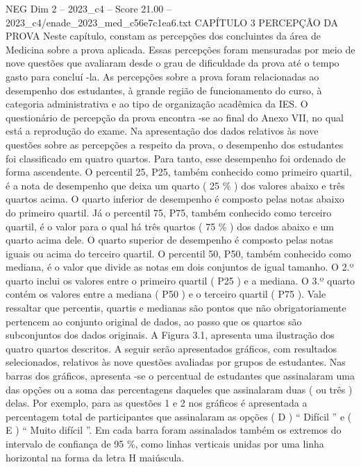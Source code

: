 \begin{textsample}{NEG Dim 2 – 2023\_c4 – Score 21.00 – 2023\_c4/enade\_2023\_med\_c56e7c1ea6.txt}  \label{ex:f2_neg_418}
CAPÍTULO 3 PERCEPÇÃO DA PROVA Neste capítulo, constam as percepções dos concluintes da área de Medicina sobre a prova aplicada.
Essas percepções foram mensuradas por meio de nove questões que avaliaram desde o grau de dificuldade da prova até o tempo gasto para concluí -la.
As percepções sobre a prova foram relacionadas ao desempenho dos estudantes, à grande região de funcionamento do curso, à categoria administrativa e ao tipo de organização acadêmica da IES.
O questionário de percepção da prova encontra -se ao final do Anexo VII, no qual está a reprodução do exame.
Na apresentação dos dados relativos às nove questões sobre as percepções a respeito da prova, o desempenho dos estudantes foi classificado em quatro quartos.
Para tanto, esse desempenho foi ordenado de forma ascendente.
O percentil 25, P25, também conhecido como primeiro quartil, é a nota de desempenho que deixa um quarto ( 25 \% ) dos valores abaixo e três quartos acima.
O quarto inferior de desempenho é composto pelas notas abaixo do primeiro quartil.
Já o percentil 75, P75, também conhecido como terceiro quartil, é o valor para o qual há três quartos ( 75 \% ) dos dados abaixo e um quarto acima dele.
O quarto superior de desempenho é composto pelas notas iguais ou acima do terceiro quartil.
O percentil 50, P50, também conhecido como mediana, é o valor que divide as notas em dois conjuntos de igual tamanho.
O 2.º quarto inclui os valores entre o primeiro quartil ( P25 ) e a mediana.
O 3.º quarto contém os valores entre a mediana ( P50 ) e o terceiro quartil ( P75 ).
Vale ressaltar que percentis, quartis e medianas são pontos que não obrigatoriamente pertencem ao conjunto original de dados, ao passo que os quartos são subconjuntos dos dados originais.
A Figura 3.1, apresenta uma ilustração dos quatro quartos descritos.
A seguir serão apresentados gráficos, com resultados selecionados, relativos às nove questões avaliadas por grupos de estudantes.
Nas barras dos gráficos, apresenta -se o percentual de estudantes que assinalaram uma das opções ou a soma das percentagens daqueles que assinalaram duas ( ou três ) delas.
Por exemplo, para as questões 1 e 2 nos gráficos é apresentada a percentagem total de participantes que assinalaram as opções ( D ) “ Difícil ” e ( E ) “ Muito difícil ”.
Em cada barra foram assinalados também os extremos do intervalo de confiança de 95 \%, como linhas verticais unidas por uma linha horizontal na forma da letra H maiúscula.

\end{textsample}
